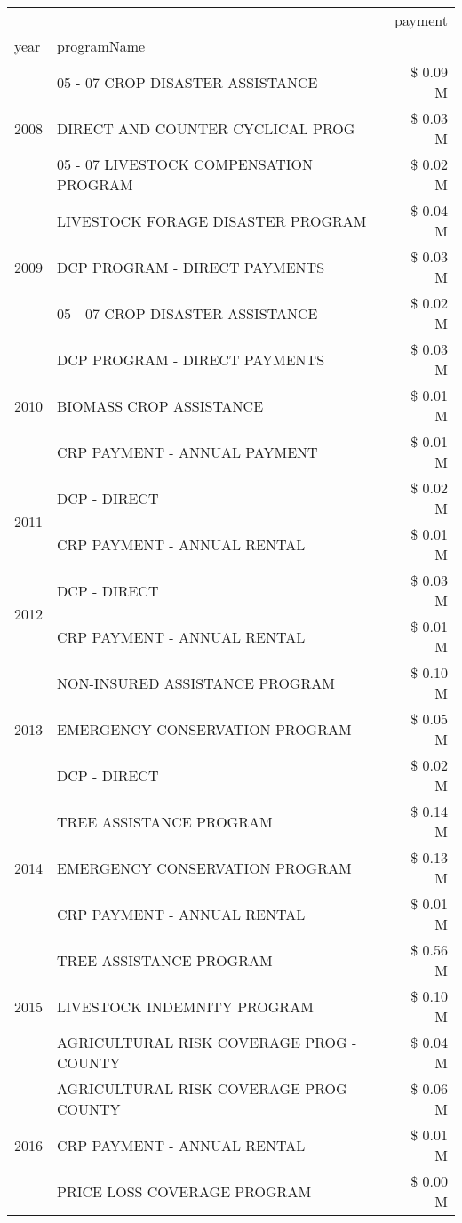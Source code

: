 \begin{tabular}{llr}
\toprule
 &  & payment \\
year & programName &  \\
\midrule
\multirow[t]{3}{*}{2008} & 05 - 07 CROP DISASTER ASSISTANCE & \$ 0.09 M \\
 & DIRECT AND COUNTER CYCLICAL PROG & \$ 0.03 M \\
 & 05 - 07 LIVESTOCK COMPENSATION PROGRAM & \$ 0.02 M \\
\cline{1-3}
\multirow[t]{3}{*}{2009} & LIVESTOCK FORAGE DISASTER  PROGRAM & \$ 0.04 M \\
 & DCP PROGRAM - DIRECT PAYMENTS & \$ 0.03 M \\
 & 05 - 07 CROP DISASTER ASSISTANCE & \$ 0.02 M \\
\cline{1-3}
\multirow[t]{3}{*}{2010} & DCP PROGRAM - DIRECT PAYMENTS & \$ 0.03 M \\
 & BIOMASS CROP ASSISTANCE & \$ 0.01 M \\
 & CRP PAYMENT - ANNUAL PAYMENT & \$ 0.01 M \\
\cline{1-3}
\multirow[t]{2}{*}{2011} & DCP - DIRECT & \$ 0.02 M \\
 & CRP PAYMENT - ANNUAL RENTAL & \$ 0.01 M \\
\cline{1-3}
\multirow[t]{2}{*}{2012} & DCP - DIRECT & \$ 0.03 M \\
 & CRP PAYMENT - ANNUAL RENTAL & \$ 0.01 M \\
\cline{1-3}
\multirow[t]{3}{*}{2013} & NON-INSURED ASSISTANCE PROGRAM & \$ 0.10 M \\
 & EMERGENCY CONSERVATION PROGRAM & \$ 0.05 M \\
 & DCP - DIRECT & \$ 0.02 M \\
\cline{1-3}
\multirow[t]{3}{*}{2014} & TREE ASSISTANCE PROGRAM & \$ 0.14 M \\
 & EMERGENCY CONSERVATION PROGRAM & \$ 0.13 M \\
 & CRP PAYMENT - ANNUAL RENTAL & \$ 0.01 M \\
\cline{1-3}
\multirow[t]{3}{*}{2015} & TREE ASSISTANCE PROGRAM & \$ 0.56 M \\
 & LIVESTOCK INDEMNITY PROGRAM & \$ 0.10 M \\
 & AGRICULTURAL RISK COVERAGE PROG - COUNTY & \$ 0.04 M \\
\cline{1-3}
\multirow[t]{3}{*}{2016} & AGRICULTURAL RISK COVERAGE PROG - COUNTY & \$ 0.06 M \\
 & CRP PAYMENT - ANNUAL RENTAL & \$ 0.01 M \\
 & PRICE LOSS COVERAGE PROGRAM & \$ 0.00 M \\

\end{tabular}
